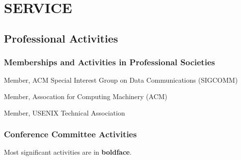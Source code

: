 
\section{SERVICE}
\label{sec:serviceld}

\subsection{Professional Activities}
\label{subsec:professional}

\subsubsection{Memberships and Activities in Professional Societies}
\label{subsubsec:memberships}

\begin{cvlist}{}
\item Member, ACM Special Interest Group on Data Communications
  (SIGCOMM)
\item Member, Assocation for Computing Machinery (ACM)
\item Member, USENIX Technical Association
\end{cvlist}

\subsubsection{Conference Committee Activities}
\label{subsubsec:mylabel4}

Most significant activities are in {\bf boldface}.

